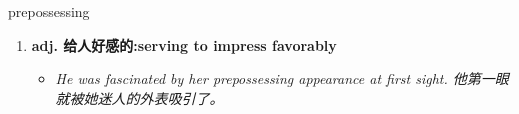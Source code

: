 
\begin{frame}
{\huge prepossessing}
\begin{center}
\begin{enumerate}\Large
  \item \textbf{adj. 给人好感的:serving to impress favorably}
  \begin{itemize}
    \item \em{\Large{He was fascinated by her prepossessing appearance at first sight. 他第一眼就被她迷人的外表吸引了。}}
  \end{itemize}
\end{enumerate}
\end{center}
\end{frame}
